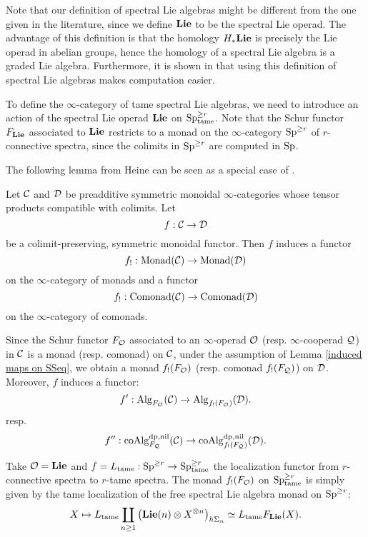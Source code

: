 \begin{remark}
Note that our definition of spectral Lie algebras might be different from the one given in the literature, since we define $\mathbf{Lie}$ to be the spectral Lie operad. 
The advantage of this definition is that the homology $H_{*}\mathbf{Lie}$ is precisely the Lie operad in abelian groups, hence the homology of a spectral Lie algebra is a graded Lie algebra. 
Furthermore, it is shown in \cite{Camarena_mod2_free_spectral_Lie_algebra} that using this definition of spectral Lie algebras makes computation easier.
\end{remark}


To define the $\infty$-category of tame spectral Lie algebras, we need to introduce an action of the spectral Lie operad $\mathbf{Lie}$ on $\operatorname{Sp}^{\geq r}_{\operatorname{tame}}$.
Note that the Schur functor $F_{\mathbf{Lie}}$ associated to $\mathbf{Lie}$ restricts to a monad on the $\infty$-category $\operatorname{Sp}^{\geq r}$ of $r$-connective spectra, since the colimits in $\operatorname{Sp}^{\geq r}$ are computed in $\operatorname{Sp}$.

The following lemma from Heine can be seen as a special case of \cite[Remark 4.6.2.9.]{HA}.
\begin{lemma}
\label{induced maps on SSeq}
\cite[Remark 5.81]{Hadrianphdthesis}
Let ${\mathcal{C}}$ and ${\mathcal{D}}$ be preadditive symmetric monoidal $\infty$-categories whose tensor products compatible with colimits. Let
$$
f: {\mathcal{C}} \to {\mathcal{D}}
$$
be a colimit-preserving, symmetric monoidal functor.
Then $f$ induces a functor
$$
f_{!}: \operatorname{Monad}({\mathcal{C}}) \to \operatorname{Monad}({\mathcal{D}})
$$
on the $\infty$-category of monads and a functor
$$
f_{!}:
\operatorname{Comonad}({\mathcal{C}}) \to \operatorname{Comonad}({\mathcal{D}})
$$
on the $\infty$-category of comonads.
\end{lemma}	

Since the Schur functor $F_{{\mathcal{O}}}$ associated to an $\infty$-operad ${\mathcal{O}}$ (resp. $\infty$-cooperad ${\mathcal{Q}}$) in ${\mathcal{C}}$ is a monad (resp. comonad) on ${\mathcal{C}}$, under the assumption of Lemma \ref{induced maps on SSeq}, we obtain a monad $f_{!}(F_{\mathcal{O}})$ (resp. comonad $f_{!}(F_{\mathcal{Q}})$) on ${\mathcal{D}}$. Moreover, $f$ induces a functor:
\[
f' : \operatorname{Alg}_{F_{\mathcal{O}}}({\mathcal{C}}) \to \operatorname{Alg}_{f_{!}(F_{\mathcal{O}})}({\mathcal{D}}).
\]
resp. 
$$
f'' : \operatorname{coAlg}^{\operatorname{dp},\operatorname{nil}}_{F_{\mathcal{Q}}}({\mathcal{C}}) \to \operatorname{coAlg}^{\operatorname{dp},\operatorname{nil}}_{f_{!}(F_{\mathcal{Q}})}({\mathcal{D}}).
$$

Take ${\mathcal{O}}=\mathbf{Lie}$ and $f=L_{\operatorname{\operatorname{tame}}}:\operatorname{Sp}^{\geq r} \to \operatorname{Sp}^{\geq r}_{\operatorname{\operatorname{tame}}}$ the localization functor from $r$-connective spectra to $r$-tame spectra. The monad $f_{!}(F_{\mathcal{O}})$ on $\operatorname{Sp}^{\geq r}_{\operatorname{\operatorname{tame}}}$ is simply given by the tame localization of the free spectral Lie algebra monad on $\operatorname{Sp}^{\geq r}$:
$$
X \mapsto  
L_{\operatorname{\operatorname{tame}}}
\coprod_{n\geq 1}
		\big(
		\mathbf{Lie}(n) \otimes X^{\otimes n}
		\big)_{h\Sigma_n}
		\simeq 
		L_{\operatorname{\operatorname{tame}}}F_{\mathbf{Lie}}(X).
$$



